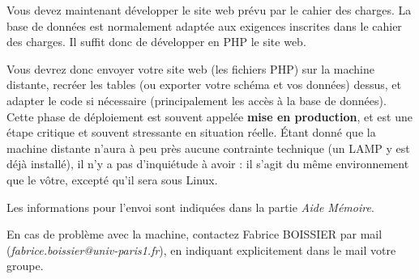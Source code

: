 

\vspace*{0.7cm}

\noindent {}

\bigskip

\noindent Vous devez maintenant développer le site web prévu par le cahier des charges.
La base de données est normalement adaptée aux exigences inscrites dans le cahier des charges.
Il suffit donc de développer en PHP le site web.

\bigskip

\noindent Vous devrez donc envoyer votre site web (les fichiers PHP) sur la machine distante, recréer les tables (ou exporter votre schéma et vos données) dessus, et adapter le code si nécessaire (principalement les accès à la base de données).
Cette phase de déploiement est souvent appelée \textbf{mise en production}, et est une étape critique et souvent stressante en situation réelle.
\'Etant donné que la machine distante n'aura à peu près aucune contrainte technique (un LAMP y est déjà installé), il n'y a pas d'inquiétude à avoir : il s'agit du même environnement que le vôtre, excepté qu'il sera sous Linux.

\bigskip

\noindent Les informations pour l'envoi sont indiquées dans la partie \textit{Aide Mémoire}.

\bigskip

\noindent En cas de problème avec la machine, contactez Fabrice BOISSIER par mail \linebreak (\textit{fabrice.boissier@univ-paris1.fr}), en indiquant explicitement dans le mail votre groupe.

